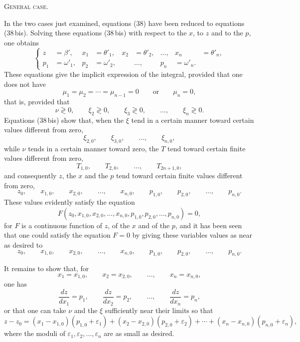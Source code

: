 \documentclass[11pt]{article}
\begin{document}
\begin{center}
{\scshape General case.}
\end{center}

In the two cases just examined, equations (38) have been reduced to equations (38\,bis). Solving these equations (38\,bis) with respect to the $x$, to $z$ and to the $p$, one obtains
\begin{equation*}\tag{43}
\left\{
\begin{aligned}
z&=\beta',& x_1&=\theta'_1,& x_2&=\theta'_2,& \ldots,& x_n&=\theta'_n,\\
p_1&=\omega'_1,& p_2&=\omega'_2,&& \ldots,& p_n&=\omega'_n.
\end{aligned}
\right.
\end{equation*}
These equations give the implicit expression of the integral, provided that one does not have
\[
\mu_1=\mu_2=\cdots=\mu_{n-1}=0\qquad \text{or}\qquad \mu_n=0,
\]
that is, provided that
\[
\nu\gtrless0,
\qquad
\xi_2\gtrless0,
\qquad
\xi_3\gtrless0,
\qquad \ldots,
\qquad
\xi_n\gtrless0.
\]
Equations (38\,bis) show that, when the $\xi$ tend in a certain manner toward certain values different from zero,
\[
\xi_{2,0},\qquad \xi_{3,0},\qquad \ldots,
\qquad \xi_{n,0},
\]
while $\nu$ tends in a certain manner toward zero, the $T$ tend toward certain finite values different from zero,
\[
T_{1,0},\qquad T_{2,0},\qquad \ldots,\qquad T_{2n+1,0},
\]
and consequently $z$, the $x$ and the $p$ tend toward certain finite values different from zero,
\[
z_0,\qquad x_{1,0},\qquad x_{2,0},\qquad \ldots,
\qquad x_{n,0},\qquad p_{1,0},\qquad p_{2,0},\qquad \ldots,
\qquad p_{n,0}.
\]
These values evidently satisfy the equation
\[
F(z_0,x_{1,0},x_{2,0},\ldots,x_{n,0},p_{1,0},p_{2,0},\ldots,p_{n,0})=0,
\]
for $F$ is a continuous function of $z$, of the $x$ and of the $p$, and it has been seen that one could satisfy the equation $F=0$ by giving these variables values as near as desired to
\[
z_0,\qquad x_{1,0},\qquad x_{2,0},\qquad \ldots,
\qquad x_{n,0},\qquad p_{1,0},\qquad p_{2,0},\qquad \ldots,
\qquad p_{n,0}.
\]

It remains to show that, for
\[
x_1=x_{1,0},\qquad x_2=x_{2,0},\qquad \ldots,\qquad x_n=x_{n,0},
\]
one has
\[
\frac{dz}{dx_1}=p_1,
\qquad
\frac{dz}{dx_2}=p_2,
\qquad \ldots,
\qquad
\frac{dz}{dx_n}=p_n,
\]
or that one can take $\nu$ and the $\xi$ sufficiently near their limits so that
\[
z-z_0=(x_1-x_{1,0})(p_{1,0}+\varepsilon_1)+(x_2-x_{2,0})(p_{2,0}+\varepsilon_2)+\cdots+(x_n-x_{n,0})(p_{n,0}+\varepsilon_n),
\]
where the moduli of $\varepsilon_1,\varepsilon_2,\ldots,\varepsilon_n$ are as small as desired.
\end{document}
